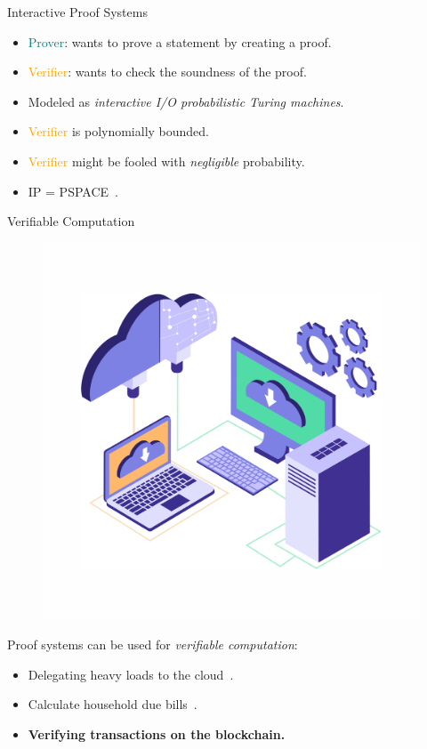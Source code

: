\documentclass[beamer={10pt,xcolor=dvipsnames},target=mst]{thud}
\begin{document}
\begin{frame}{Interactive Proof Systems~\cite{GoldwasserMR1989}}
\begin{itemize}
    \item \textcolor{teal}{Prover}: wants to prove a statement by creating a proof.
    \item \textcolor{orange}{Verifier}: wants to check the soundness of the proof.
    \item Modeled as \emph{interactive I/O probabilistic Turing machines}.
    \item \textcolor{orange}{Verifier} is polynomially bounded.
    \item \textcolor{orange}{Verifier} might be fooled with \emph{negligible} probability.
    \item \textsc{IP} = \textsc{PSPACE}~\cite{Shamir1992}.
  \end{itemize}
\end{frame}

\begin{frame}{Verifiable Computation}
  \begin{figure}
    \centering
    \href{https://www.template.net/editable/illustrations}{
      \includegraphics[scale=0.0625]{res/cloud_computing.pdf}}
  \end{figure}
  Proof systems can be used for \emph{verifiable computation}:
  \begin{itemize}
    \item Delegating heavy loads to the cloud~\cite{AndersonCKLW2002}.
    \item Calculate household due bills~\cite{ParnoGHR2013}.
    \item \textbf{Verifying transactions on the blockchain.}~\cite{SassonCGGMTV2014}
  \end{itemize}
\end{frame}
\end{document}
